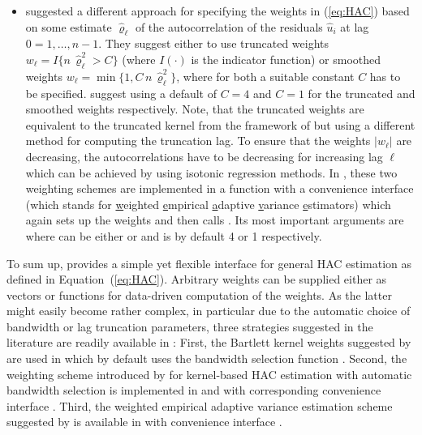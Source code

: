 \documentclass{Z}
\begin{document}
\begin{itemize}
\item \cite{hac:Lumley+Heagerty:1999} suggested a different approach for specifying 
the weights in (\ref{eq:HAC}) based on some estimate $\hat \varrho_\ell$ of
the autocorrelation of the residuals $\hat u_i$ at lag $0 = 1, \dots, n-1$.
They suggest either to use truncated weights $w_\ell = I\{n \, \hat \varrho^2_\ell > C\}$
(where $I(\cdot)$ is the indicator function) or smoothed weights
$w_\ell = \min\{1, C \, n \, \hat \varrho^2_\ell\}$, where for both a suitable constant
$C$ has to be specified. \cite{hac:Lumley+Heagerty:1999} suggest using a default
of $C = 4$ and $C = 1$ for the truncated and smoothed weights respectively.
Note, that the truncated weights are equivalent to the truncated kernel from the
framework of \cite{hac:Andrews:1991} but using a different method for computing the
truncation lag. To ensure that the weights $|w_\ell|$ are decreasing, the
autocorrelations have to be decreasing for increasing lag $\ell$ which can be achieved
by using isotonic regression methods.
In , these two weighting schemes are implemented in a function
 with a convenience interface  
(which stands for \underline{w}eighted \underline{e}mpirical \underline{a}daptive
\underline{v}ariance \underline{e}stimators) which again sets
up the weights and then calls . Its most important arguments are
 where  can be either
 or  and  is by default 4 or 1 respectively.

\end{itemize}

To sum up,  provides a simple yet flexible interface for general
HAC estimation as defined in Equation~(\ref{eq:HAC}).
Arbitrary weights can be supplied either as vectors or functions for data-driven
computation of the weights. As the latter might easily become rather complex,
in particular due to the automatic choice of bandwidth or lag truncation parameters,
three strategies suggested in the literature are readily available in :
First, the Bartlett kernel weights suggested by \cite{hac:Newey+West:1987,hac:Newey+West:1994}
are used in  which by default uses the bandwidth selection function
.
Second, the weighting scheme introduced by \cite{hac:Andrews:1991} for kernel-based
HAC estimation with automatic bandwidth selection is implemented in 
and  with corresponding convenience interface .
Third, the weighted empirical adaptive variance estimation scheme suggested by
\cite{hac:Lumley+Heagerty:1999} is available in  with convenience
interface .
\end{document}
